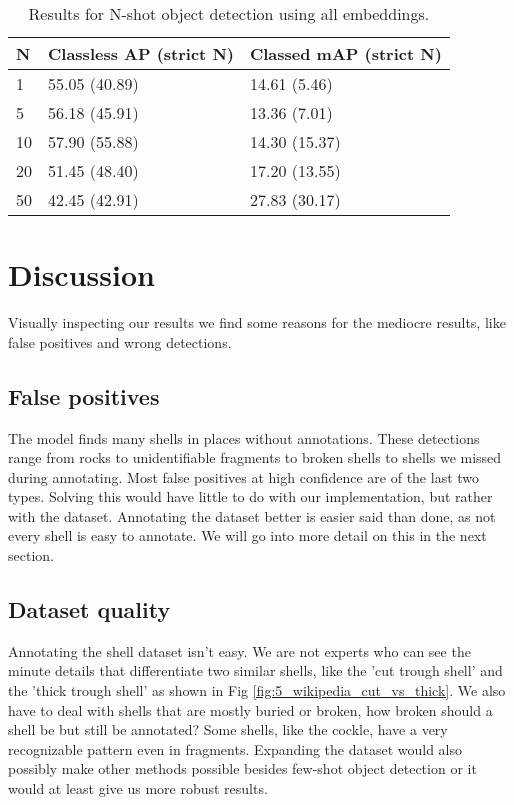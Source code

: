 \begin{table}[H]
    \centering
    \captionsetup{justification=centering}
    \begin{tabular}{|l|l|l|}
        \hline
        N & Classless AP (strict N) & Classed mAP (strict N) \\ \hline
        1 & 55.05 (40.89) & 14.61 (5.46) \\ \hline
        5 & 56.18 (45.91) & 13.36 (7.01) \\ \hline
        10 & 57.90 (55.88) & 14.30 (15.37) \\ \hline
        20 & 51.45 (48.40) & 17.20 (13.55) \\ \hline
        50 & 42.45 (42.91) & 27.83 (30.17) \\ \hline
    \end{tabular}
    \caption{Results for N-shot object detection using all embeddings.}
    \label{tab:5_all_embeddings_results}
\end{table}

\section{Discussion}
Visually inspecting our results we find some reasons for the mediocre results, like false positives and wrong detections.

\subsection*{False positives}
The model finds many shells in places without annotations. These detections range from rocks to unidentifiable fragments to broken shells to shells we missed during annotating. Most false positives at high confidence are of the last two types. Solving this would have little to do with our implementation, but rather with the dataset. Annotating the dataset better is easier said than done, as not every shell is easy to annotate. We will go into more detail on this in the next section.

\subsection*{Dataset quality}
Annotating the shell dataset isn't easy. We are not experts who can see the minute details that differentiate two similar shells, like the 'cut trough shell' and the 'thick trough shell' as shown in Fig \ref{fig:5_wikipedia_cut_vs_thick}. We also have to deal with shells that are mostly buried or broken, how broken should a shell be but still be annotated? Some shells, like the cockle, have a very recognizable pattern even in fragments. Expanding the dataset would also possibly make other methods possible besides few-shot object detection or it would at least give us more robust results.


